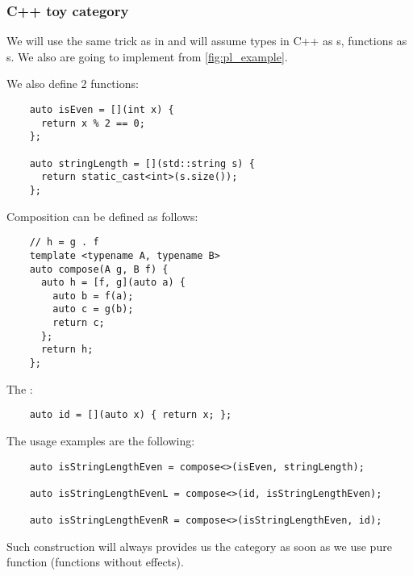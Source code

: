 \subsubsection{\textbf{C++} toy category}
\begin{example}
  \label{ex:cppcategory}
  We will use the same trick as in  and
  will assume 
  types in C++ as s, 
  functions as s.
  We also are going to implement
   from \cref{fig:pl_example}.


  We  also define 2 functions:
  \begin{verbatim}
    auto isEven = [](int x) { 
      return x % 2 == 0; 
    };

    auto stringLength = [](std::string s) { 
      return static_cast<int>(s.size()); 
    };
  \end{verbatim}

  Composition can be defined as follows:
  \begin{verbatim}
    // h = g . f
    template <typename A, typename B> 
    auto compose(A g, B f) {
      auto h = [f, g](auto a) {
        auto b = f(a);
        auto c = g(b);
        return c;
      };
      return h;
    };
  \end{verbatim}

  The :
  \begin{verbatim}
    auto id = [](auto x) { return x; };
  \end{verbatim}

  The usage examples are the following:
  \begin{verbatim}
    auto isStringLengthEven = compose<>(isEven, stringLength);

    auto isStringLengthEvenL = compose<>(id, isStringLengthEven);

    auto isStringLengthEvenR = compose<>(isStringLengthEven, id);  
  \end{verbatim}

  Such construction will always provides us the category as soon as we
  use pure function (functions without effects).
\end{example}

